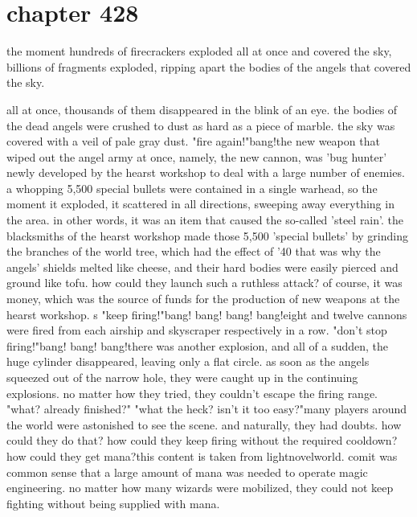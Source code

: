 \section{chapter 428}

the moment hundreds of firecrackers exploded all at once and covered the sky, billions of fragments exploded, ripping apart the bodies of the angels that covered the sky.





all at once, thousands of them disappeared in the blink of an eye.
the bodies of the dead angels were crushed to dust as hard as a piece of marble.
 the sky was covered with a veil of pale gray dust.
"fire again!"bang!the new weapon that wiped out the angel army at once, namely, the new cannon, was 'bug hunter' newly developed by the hearst workshop to deal with a large number of enemies.
a whopping 5,500 special bullets were contained in a single warhead, so the moment it exploded, it scattered in all directions, sweeping away everything in the area.
 in other words, it was an item that caused the so-called 'steel rain'.
the blacksmiths of the hearst workshop made those 5,500 'special bullets' by grinding the branches of the world tree, which had the effect of '40%
that was why the angels' shields melted like cheese, and their hard bodies were easily pierced and ground like tofu.
how could they launch such a ruthless attack? of course, it was money, which was the source of funds for the production of new weapons at the hearst workshop.
s "keep firing!"bang! bang! bang! bang!eight and twelve cannons were fired from each airship and skyscraper respectively in a row.
"don't stop firing!"bang! bang! bang!there was another explosion, and all of a sudden, the huge cylinder disappeared, leaving only a flat circle.
 as soon as the angels squeezed out of the narrow hole, they were caught up in the continuing explosions.
no matter how they tried, they couldn't escape the firing range.
"what? already finished?"
"what the heck? isn't it too easy?"many players around the world were astonished to see the scene.
 and naturally, they had doubts.
 how could they do that? how could they keep firing without the required cooldown? how could they get mana?this content is taken from lightnovelworld.
c­omit was common sense that a large amount of mana was needed to operate magic engineering.
no matter how many wizards were mobilized, they could not keep fighting without being supplied with mana.
